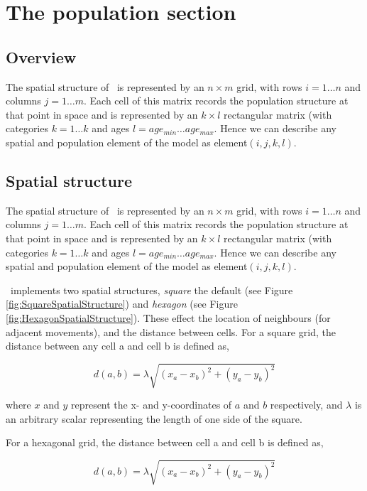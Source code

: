 \section{The population section\label{sec:population-section}}

\subsection{Overview}

The spatial structure of \SPM\ is represented by an $n \times m$ grid, with rows $i=1 \dots n$ and columns $j=1 \ldots m$. Each cell of this matrix records the population structure at that point in space and is represented by an $k \times l$ rectangular matrix (with categories $k=1 \ldots k$ and ages $l=age_{min} \ldots age_{max}$. Hence we can describe any spatial and population element of the model as element$(i,j,k,l)$. 

\subsection{Spatial structure}

The spatial structure of \SPM\ is represented by an $n \times m$ grid, with rows $i=1 \dots n$ and columns $j=1 \ldots m$. Each cell of this matrix records the population structure at that point in space and is represented by an $k \times l$ rectangular matrix (with categories $k=1 \ldots k$ and ages $l=age_{min} \ldots age_{max}$. Hence we can describe any spatial and population element of the model as element$(i,j,k,l)$. 

\SPM\ implements two spatial structures, \emph{square} \textemdash the default (see Figure \ref{fig:SquareSpatialStructure}) and \emph{hexagon} (see Figure \ref{fig:HexagonSpatialStructure}). These effect the location of neighbours (for adjacent movements), and the distance between cells. For a square grid, the distance between any cell a and cell b is defined as,

\[
d\left( {a,b} \right) = \lambda \sqrt {\left( {x_a  - x_b } \right)^2  + \left( {y_a  - y_b } \right)^2 } 
\]

where $x$ and $y$ represent the x- and y-coordinates of $a$ and $b$ respectively, and $\lambda$ is an arbitrary scalar representing the length of one side of the square.

For a hexagonal grid, the distance between cell a and cell b is defined as,

\[
d\left( {a,b} \right) = \lambda \sqrt {\left( {x_a  - x_b } \right)^2  + \left( {y_a  - y_b } \right)^2 } 
\]

